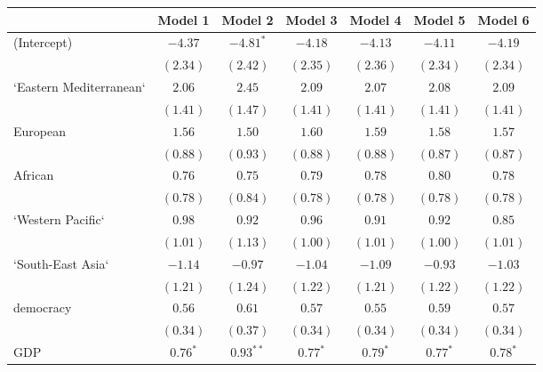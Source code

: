 
\begin{table}[!h]
\begin{center}
\begin{tabular}{l c c c c c c }
\toprule
 & Model 1 & Model 2 & Model 3 & Model 4 & Model 5 & Model 6 \\
\midrule
(Intercept)             & $-4.37$      & $-4.81^{*}$  & $-4.18$      & $-4.13$      & $-4.11$      & $-4.19$      \\
                        & $(2.34)$     & $(2.42)$     & $(2.35)$     & $(2.36)$     & $(2.34)$     & $(2.34)$     \\
`Eastern Mediterranean` & $2.06$       & $2.45$       & $2.09$       & $2.07$       & $2.08$       & $2.09$       \\
                        & $(1.41)$     & $(1.47)$     & $(1.41)$     & $(1.41)$     & $(1.41)$     & $(1.41)$     \\
European                & $1.56$       & $1.50$       & $1.60$       & $1.59$       & $1.58$       & $1.57$       \\
                        & $(0.88)$     & $(0.93)$     & $(0.88)$     & $(0.88)$     & $(0.87)$     & $(0.87)$     \\
African                 & $0.76$       & $0.75$       & $0.79$       & $0.78$       & $0.80$       & $0.78$       \\
                        & $(0.78)$     & $(0.84)$     & $(0.78)$     & $(0.78)$     & $(0.78)$     & $(0.78)$     \\
`Western Pacific`       & $0.98$       & $0.92$       & $0.96$       & $0.91$       & $0.92$       & $0.85$       \\
                        & $(1.01)$     & $(1.13)$     & $(1.00)$     & $(1.01)$     & $(1.00)$     & $(1.01)$     \\
`South-East Asia`       & $-1.14$      & $-0.97$      & $-1.04$      & $-1.09$      & $-0.93$      & $-1.03$      \\
                        & $(1.21)$     & $(1.24)$     & $(1.22)$     & $(1.21)$     & $(1.22)$     & $(1.22)$     \\
democracy               & $0.56$       & $0.61$       & $0.57$       & $0.55$       & $0.59$       & $0.57$       \\
                        & $(0.34)$     & $(0.37)$     & $(0.34)$     & $(0.34)$     & $(0.34)$     & $(0.34)$     \\
GDP                     & $0.76^{*}$   & $0.93^{**}$  & $0.77^{*}$   & $0.79^{*}$   & $0.77^{*}$   & $0.78^{*}$   \\

\end{tabular}
\end{center}
\end{table}
